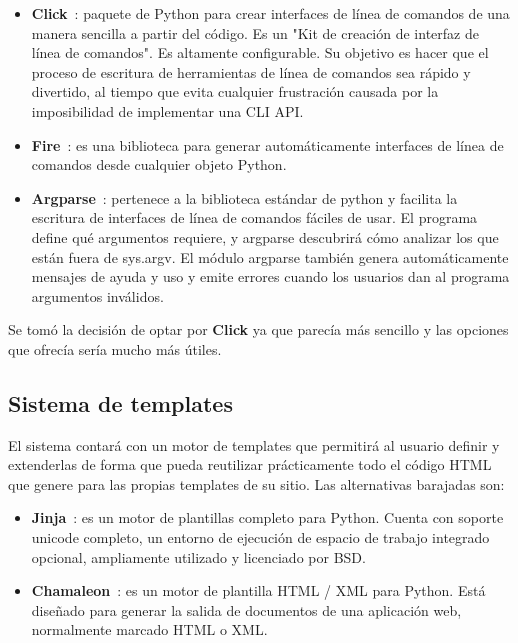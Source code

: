 \begin{itemize}
    \item \textbf{Click}~\cite{click}: paquete de Python para crear interfaces de línea de comandos de
una manera sencilla a partir del código. Es un "Kit de creación de interfaz de
línea de comandos". Es altamente configurable. Su objetivo es
hacer que el proceso de escritura de herramientas de línea de comandos sea rápido y divertido, al tiempo
que evita cualquier frustración causada por la imposibilidad de implementar una CLI API.
\item \textbf{Fire}~\cite{python-fire}: es una biblioteca para generar automáticamente interfaces de línea de comandos
desde cualquier objeto Python.
\item \textbf{Argparse}~\cite{argparse}: pertenece a la biblioteca estándar de python y facilita la escritura de interfaces
de línea de comandos fáciles de usar. El programa define qué argumentos requiere, y argparse descubrirá cómo
analizar los que están fuera de sys.argv. El módulo argparse también genera automáticamente mensajes de ayuda
y uso y emite errores cuando los usuarios dan al programa argumentos inválidos.
\end{itemize}

Se tomó la decisión de optar por \textbf{Click} ya que parecía más sencillo y las opciones que ofrecía sería mucho
más útiles.

\subsection{Sistema de templates}

El sistema contará con un motor de templates que permitirá al usuario definir y extenderlas de forma que pueda reutilizar
prácticamente todo el código HTML que genere para las propias templates de su sitio. Las alternativas barajadas son:


\begin{itemize}
\item \textbf{Jinja}~\cite{jinja}: es un motor de plantillas completo para Python. Cuenta con soporte unicode completo,
un entorno de ejecución de espacio de trabajo integrado opcional, ampliamente utilizado y licenciado por BSD.
\item \textbf{Chamaleon}~\cite{chamaleon}: es un motor de plantilla HTML / XML para Python. Está diseñado para generar
la salida de documentos de una aplicación web, normalmente marcado HTML o XML.
\end{itemize}

